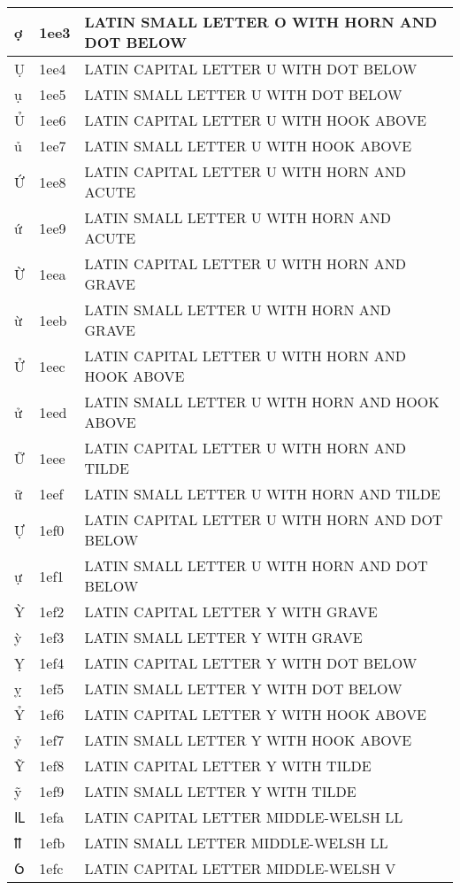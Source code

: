 \documentclass[12pt,letterpaper,openany]{book}
\begin{document}
\begin{center}
\begin{supertabular}{|m{0.25in}|m{0.5in}|m{4in}|}
			ợ & 1ee3 & LATIN SMALL LETTER O WITH HORN AND DOT BELOW\\\hline
			Ụ & 1ee4 & LATIN CAPITAL LETTER U WITH DOT BELOW\\\hline
			ụ & 1ee5 & LATIN SMALL LETTER U WITH DOT BELOW\\\hline
			Ủ & 1ee6 & LATIN CAPITAL LETTER U WITH HOOK ABOVE\\\hline
			ủ & 1ee7 & LATIN SMALL LETTER U WITH HOOK ABOVE\\\hline
			Ứ & 1ee8 & LATIN CAPITAL LETTER U WITH HORN AND ACUTE\\\hline
			ứ & 1ee9 & LATIN SMALL LETTER U WITH HORN AND ACUTE\\\hline
			Ừ & 1eea & LATIN CAPITAL LETTER U WITH HORN AND GRAVE\\\hline
			ừ & 1eeb & LATIN SMALL LETTER U WITH HORN AND GRAVE\\\hline
			Ử & 1eec & LATIN CAPITAL LETTER U WITH HORN AND HOOK ABOVE\\\hline
			ử & 1eed & LATIN SMALL LETTER U WITH HORN AND HOOK ABOVE\\\hline
			Ữ & 1eee & LATIN CAPITAL LETTER U WITH HORN AND TILDE\\\hline
			ữ & 1eef & LATIN SMALL LETTER U WITH HORN AND TILDE\\\hline
			Ự & 1ef0 & LATIN CAPITAL LETTER U WITH HORN AND DOT BELOW\\\hline
			ự & 1ef1 & LATIN SMALL LETTER U WITH HORN AND DOT BELOW\\\hline
			Ỳ & 1ef2 & LATIN CAPITAL LETTER Y WITH GRAVE\\\hline
			ỳ & 1ef3 & LATIN SMALL LETTER Y WITH GRAVE\\\hline
			Ỵ & 1ef4 & LATIN CAPITAL LETTER Y WITH DOT BELOW\\\hline
			ỵ & 1ef5 & LATIN SMALL LETTER Y WITH DOT BELOW\\\hline
			Ỷ & 1ef6 & LATIN CAPITAL LETTER Y WITH HOOK ABOVE\\\hline
			ỷ & 1ef7 & LATIN SMALL LETTER Y WITH HOOK ABOVE\\\hline
			Ỹ & 1ef8 & LATIN CAPITAL LETTER Y WITH TILDE\\\hline
			ỹ & 1ef9 & LATIN SMALL LETTER Y WITH TILDE\\\hline
			Ỻ & 1efa & LATIN CAPITAL LETTER MIDDLE-WELSH LL\\\hline
			ỻ & 1efb & LATIN SMALL LETTER MIDDLE-WELSH LL\\\hline
			Ỽ & 1efc & LATIN CAPITAL LETTER MIDDLE-WELSH V\\\hline

\end{supertabular}
\end{center}
\end{document}
